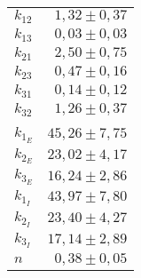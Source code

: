 \begin{tabular}{lr}
\midrule
$k_{12}$   &  $1,32 \pm0,37 $\\
$k_{13}$   &  $0,03 \pm0,03 $\\
$k_{21}$   &  $2,50 \pm0,75 $\\
$k_{23}$   &  $0,47 \pm0,16 $\\
$k_{31}$   &  $0,14 \pm0,12 $\\
$k_{32}$   &  $1,26 \pm0,37 $\\
&\\                       
$k_{1_E}$   & $45,26\pm 7,75$ \\
$k_{2_E}$   & $23,02\pm 4,17$ \\
$k_{3_E}$   & $16,24\pm 2,86$ \\
$k_{1_I}$   & $43,97\pm 7,80$ \\
$k_{2_I}$   & $23,40\pm 4,27$ \\
$k_{3_I}$   & $17,14\pm 2,89$ \\
\midrule
$n$         & $0,38 \pm 0,05$ \\
\bottomrule
\end{tabular}
